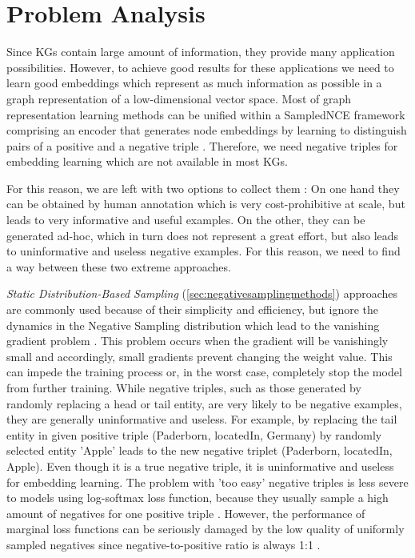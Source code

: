 \section{Problem Analysis} 
\label{sec:problemanalysis}


Since \acp{KG} contain large amount of information, they provide many application possibilities.
However, to achieve good results for these applications we need to learn good embeddings which represent as much information as possible in a graph representation of a low-dimensional vector space.
Most of graph representation learning methods can be unified within a \ac{SampledNCE} framework comprising an encoder that generates node embeddings by learning to distinguish pairs of a positive and a negative triple \cite{MCNS}.
Therefore, we need negative triples for embedding learning which are not available in most \acp{KG}. 

For this reason, we are left with two options to collect them \cite{safavi2021negater}: 
On one hand they can be obtained by human annotation which is very cost-prohibitive at scale, but leads to very informative and useful examples. 
On the other, they can be generated ad-hoc, which in turn does not represent a great effort, but also leads to uninformative and useless negative examples.
For this reason, we need to find a way between these two extreme approaches.






\textit{Static Distribution-Based Sampling} (\autoref{sec:negativesamplingmethods}) approaches are commonly used because of their simplicity and efficiency, but ignore the dynamics in the Negative Sampling distribution which lead to the vanishing gradient problem \cite{qianunderstanding}.
This problem occurs when the gradient will be vanishingly small and accordingly, small gradients prevent changing the weight value.
This can impede the training process or, in the worst case, completely stop the model from further training.
While negative triples, such as those generated by randomly replacing a head or tail entity, are very likely to be negative examples, they are generally uninformative and useless.
For example, by replacing the tail entity in given positive triple (Paderborn, locatedIn, Germany) by randomly selected entity 'Apple' leads to the new negative triplet (Paderborn, locatedIn, Apple).
Even though it is a true negative triple, it is uninformative and useless for embedding learning.
The problem with 'too easy' negative triples is less severe to models using log-softmax loss function, because they usually sample a high amount of negatives for one positive triple \cite{cai2017kbgan}.
However, the performance of marginal loss functions can be seriously damaged by the low quality of uniformly sampled negatives since negative-to-positive ratio is always 1:1 \cite{cai2017kbgan}.


